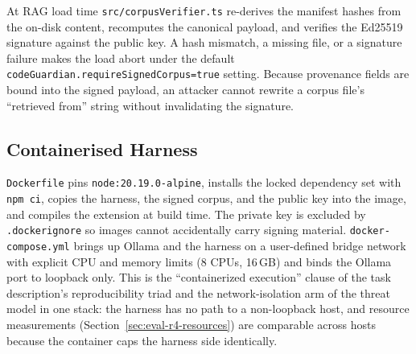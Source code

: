 At RAG load time \texttt{src/corpusVerifier.ts} re-derives the manifest
hashes from the on-disk content, recomputes the canonical payload, and
verifies the Ed25519 signature against the public key. A hash mismatch,
a missing file, or a signature failure makes the load abort under
the default \texttt{codeGuardian.requireSignedCorpus=true} setting.
Because provenance fields are bound into the signed payload, an attacker
cannot rewrite a corpus file's ``retrieved from'' string without
invalidating the signature.

\subsection{Containerised Harness}
\label{sec:impl-container}

\texttt{Dockerfile} pins \texttt{node:20.19.0-alpine}, installs the
locked dependency set with \texttt{npm ci}, copies the harness, the signed
corpus, and the public key into the image, and compiles the extension at
build time. The private key is excluded by \texttt{.dockerignore} so
images cannot accidentally carry signing material.
\texttt{docker-compose.yml} brings up Ollama and the harness on a
user-defined bridge network with explicit CPU and memory limits (8 CPUs,
16\,GB) and binds the Ollama port to loopback only. This is the
``containerized execution'' clause of the task description's
reproducibility triad and the network-isolation arm of the threat model
in one stack: the harness has no path to a non-loopback host, and resource
measurements (Section~\ref{sec:eval-r4-resources}) are comparable across
hosts because the container caps the harness side identically.
